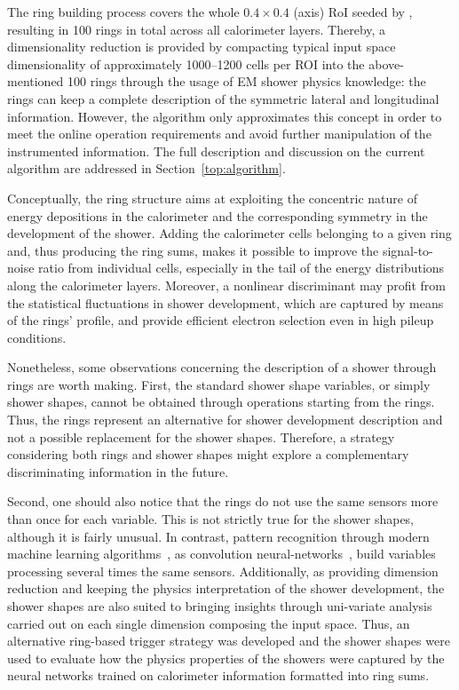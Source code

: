 The ring building process covers the whole $0.4\times0.4$ (\etaphi axis) RoI
seeded by \licalo, resulting in 100 rings in total across all calorimeter layers.
Thereby, a dimensionality reduction is provided by compacting
typical input space dimensionality of approximately 1000--1200 cells per ROI into
the above-mentioned 100 rings through the usage of EM shower physics knowledge: the rings can keep a complete description of the symmetric lateral and
longitudinal information. However, the algorithm only approximates this concept
in order to meet the online operation requirements and avoid further
manipulation of the instrumented information. The full description and
discussion on the current algorithm are addressed in
Section~\ref{top:algorithm}.



Conceptually, the ring structure aims at exploiting the concentric nature of energy depositions in the calorimeter and the corresponding symmetry in the development of the shower.  Adding the calorimeter cells belonging to a given ring and, thus producing the ring sums, makes it possible to improve the signal-to-noise ratio from individual cells, especially in the tail of the energy distributions along the calorimeter layers.  Moreover, a nonlinear discriminant may profit from the statistical fluctuations in shower development, which are captured by means of the rings' profile, and provide efficient electron selection even in high pileup conditions.

Nonetheless, some observations concerning the description of a shower through rings are worth making. First, the standard shower shape variables, or simply shower shapes, cannot be obtained through operations starting from the rings.  Thus, the rings represent an alternative for shower development description and not a possible replacement for the shower shapes.  Therefore, a strategy considering both rings and shower shapes might explore a complementary discriminating information in the future.



Second, one should also notice
that the rings do not use the same sensors more than once for each variable.
This is not strictly true for the shower shapes, although it is fairly unusual.
In contrast, pattern recognition through modern machine learning
algorithms~\cite{Engelbrecht2007,Goodfellow2016}, as convolution
neural-networks~\cite{Gu2018}, build variables processing several times
the same sensors. Additionally, as providing dimension reduction and keeping the physics interpretation of the shower development, the shower shapes are also suited to bringing insights through uni-variate analysis carried out on each
single dimension composing the input space.
Thus, an alternative ring-based trigger strategy was developed and the shower shapes were used to evaluate how the physics properties of the showers were captured by the neural networks trained on calorimeter information formatted into ring sums. 









